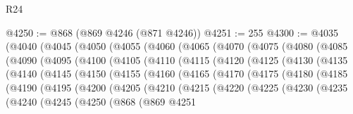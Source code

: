 \begin{lexlean}{R24}
\begin{coremodule}
{{{{{{{{{{{{{{{{{{{{{{{{{{{{{{{{{{{{{{{{{{{{{{{{{{{{{{{{{{{{{{{{{{{{{{{{{{{{{{{{{{{{{{{{{{{{{{{{{{{{{{{{{{{{{{{{{{{{{{{{{{{{{{{{{{{{{{{{{{{{{{{{{{{{{{{{{{{{{{{{{{{{{{{{{{{{{{{{{{{{{{{{{{{{{{{{{{{@4250 := @868 (@869 @4246 (@871 @4246))
@4251 := 255
@4300 := @4035
    (@4040
      (@4045
        (@4050
          (@4055
            (@4060
              (@4065
                (@4070
                  (@4075
                    (@4080
                      (@4085
                        (@4090
                          (@4095
                            (@4100
                              (@4105
                                (@4110
                                  (@4115
                                    (@4120
                                      (@4125
                                        (@4130
                                          (@4135
                                            (@4140
                                              (@4145
                                                (@4150
                                                  (@4155
                                                    (@4160
                                                      (@4165
                                                        (@4170
                                                          (@4175
                                                            (@4180
                                                              (@4185
                                                                (@4190
                                                                  (@4195
                                                                    (@4200
                                                                      (@4205
                                                                        (@4210
                                                                          (@4215
                                                                            (@4220
                                                                              (@4225
                                                                                (@4230
                                                                                  (@4235
                                                                                    (@4240
                                                                                      (@4245
                                                                                        (@4250
                                                                                          (@868
                                                                                            (@869
                                                                                              @4251
}}}}}}}}}}}}}}}}}}}}}}}}}}}}}}}}}}}}}}}}}}}}}}}}}}}}}}}}}}}}}}}}}}}}}}}}}}}}}}}}}}}}}}}}}}}}}}}}}}}}}}}}}}}}}}}}}}}}}}}}}}}}}}}}}}}}}}}}}}}}}}}}}}}}}}}}}}}}}}}}}}}}}}}}}}}}}}}}}}}}}}}}}}}}}}}}}}}
\end{coremodule}
\end{lexlean}
